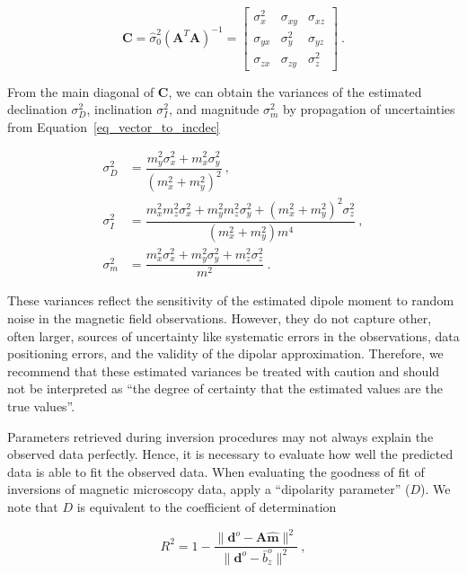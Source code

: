 \begin{equation}
\label{eq_covariance}
\mathbf{C}
=
\hat{\sigma}_0^2 (\mathbf{A}^T\mathbf{A})^{-1}
=
\begin{bmatrix}
\sigma_x^2 & \sigma_{xy} & \sigma_{xz} \\
\sigma_{yx} & \sigma_y^2 & \sigma_{yz} \\
\sigma_{zx} & \sigma_{zy} & \sigma_z^2
\end{bmatrix}
\ .
\end{equation}

\noindent
From the main diagonal of $\mathbf{C}$, we can obtain the variances of the
estimated declination $\sigma_D^2$, inclination $\sigma_I^2$, and magnitude $\sigma_m^2$
by propagation of uncertainties from Equation~\ref{eq_vector_to_incdec}

\begin{equation}
\label{eq_variances}
\begin{aligned}
\sigma_D^2 &= \dfrac{m_y^2\sigma_x^2 + m_x^2\sigma_y^2}{\left(m_x^2 + m_y^2\right)^2} \ , \\
\sigma_I^2 &= \dfrac{m_x^2 m_z^2 \sigma_x^2 + m_y^2 m_z^2 \sigma_y^2 + \left(m_x^2 + m_y^2\right)^2\sigma_z^2}{\left(m_x^2 + m_y^2\right) m^4} \ , \\
\sigma_m^2 &= \dfrac{m_x^2\sigma_x^2 + m_y^2\sigma_y^2 + m_z^2\sigma_z^2}{m^2} \ .
\end{aligned}
\end{equation}

\noindent
These variances reflect the sensitivity of the estimated dipole moment to random noise in the magnetic field observations. However, they do not capture other, often larger, sources of uncertainty like systematic errors in the observations, data positioning errors, and the validity of the dipolar approximation. Therefore, we recommend that these estimated variances be treated with caution and should not be interpreted as ``the degree of certainty that the estimated values are the true values''.

Parameters retrieved during inversion procedures may not always explain the observed data perfectly.
Hence, it is necessary to evaluate how well the predicted data is able to fit the observed data.
When evaluating the goodness of fit of inversions of magnetic microscopy data, \citet{Fu2020} apply a ``dipolarity parameter'' ($D$).
We note that $D$ is equivalent to the coefficient of determination

\begin{equation}
\label{eq_r2}
R^2 = 1 - \dfrac{\|\mathbf{d}^o - \mathbf{A}\hat{\mathbf{m}}\|^2}{\|\mathbf{d}^o - \bar{b}_z^o\|^2}\ ,
\end{equation}

